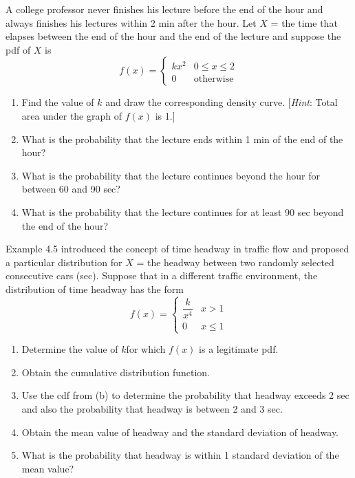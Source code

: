\documentclass[11pt,letterpaper,boxed]{hmcpset}
\begin{document}
{\begin{problem}[4.1.5]
	A college professor never finishes his lecture before the end of the hour and always finishes his lectures within 2 min after the hour. Let $X$ = the time that elapses between the end of the hour and the end of the lecture and suppose the pdf of $X$ is
		$$f(x) = \begin{cases}
			kx^2 & 0 \leq x \leq 2 \\
			0 & \mbox{otherwise}
		\end{cases}$$
	\begin{enumerate}
		\item
			Find the value of $k$ and draw the corresponding density curve. [\textit{Hint}: Total area under the graph of $f(x)$ is 1.]
		\item
			What is the probability that the lecture ends within 1 min of the end of the hour?
		\item
			What is the probability that the lecture continues beyond the hour for between 60 and 90 sec?
		\item
			What is the probability that the lecture continues for at least 90 sec beyond the end of the hour?
	\end{enumerate}
\end{problem}

\begin{solution}
	\vfill
\end{solution}
\newpage


\begin{problem}[4.2.13]
	Example 4.5 introduced the concept of time headway in traffic flow and proposed a particular distribution for $X$ = the headway between two randomly selected consecutive cars (sec). Suppose that in a different traffic environment, the distribution of time headway has the form
		$$f(x) = \begin{cases}
			\dfrac{k}{x^4} & x > 1 \\
			0 & x \leq 1
		\end{cases}$$
	\begin{enumerate}
		\item
			Determine the value of $k $for which $f(x)$ is a legitimate pdf.
		\item
			Obtain the cumulative distribution function.
		\item
			Use the cdf from (b) to determine the probability that headway exceeds 2 sec and also the probability that headway is between 2 and 3 sec.
		\item
			Obtain the mean value of headway and the standard deviation of headway.
		\item
			What is the probability that headway is within 1 standard deviation of the mean value?
	\end{enumerate}
\end{problem}

}
\end{document}
